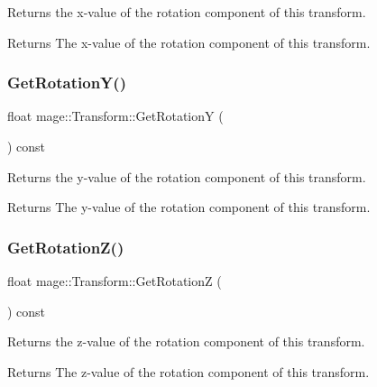 Returns the x-\/value of the rotation component of this transform.

\begin{DoxyReturn}{Returns}
The x-\/value of the rotation component of this transform. 
\end{DoxyReturn}
\hypertarget{structmage_1_1_transform_a93ccd53bd0a4e71ab7f42447d482ab86}{}\label{structmage_1_1_transform_a93ccd53bd0a4e71ab7f42447d482ab86} 
\subsubsection{\texorpdfstring{Get\+Rotation\+Y()}{GetRotationY()}}
{\footnotesize\ttfamily float mage\+::\+Transform\+::\+Get\+RotationY (\begin{DoxyParamCaption}{ }\end{DoxyParamCaption}) const}

Returns the y-\/value of the rotation component of this transform.

\begin{DoxyReturn}{Returns}
The y-\/value of the rotation component of this transform. 
\end{DoxyReturn}
\hypertarget{structmage_1_1_transform_ae1dd099e12e6dedadbc31d679343b39a}{}\label{structmage_1_1_transform_ae1dd099e12e6dedadbc31d679343b39a} 
\subsubsection{\texorpdfstring{Get\+Rotation\+Z()}{GetRotationZ()}}
{\footnotesize\ttfamily float mage\+::\+Transform\+::\+Get\+RotationZ (\begin{DoxyParamCaption}{ }\end{DoxyParamCaption}) const}

Returns the z-\/value of the rotation component of this transform.

\begin{DoxyReturn}{Returns}
The z-\/value of the rotation component of this transform. 
\end{DoxyReturn}
\hypertarget{structmage_1_1_transform_a38234d822ee1ffbbcfb2601a1d5f8475}{}\label{structmage_1_1_transform_a38234d822ee1ffbbcfb2601a1d5f8475} 
